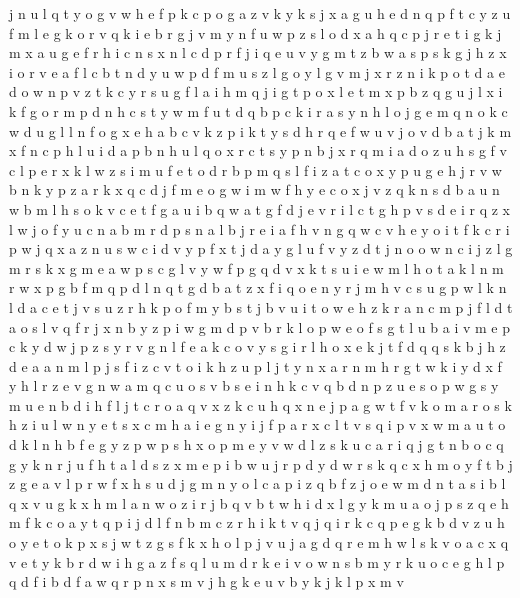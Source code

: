 \documentclass{article}
\begin{document}
j n u l q t y o g v w h e f p k c
p o g a z v k
y k s j x a g u h e d n q p f
t
c y z u f m l e g k o r v q
k i e b r g j v m y n f u w p z s l o d x a h q c
p j r e t i g
k j m x a u g e f r h i c n s
x n l c d p r f j i q e u v y g m t z b w a s
p s k g j h z x i o r v e a f l c b t n d y u w
p d f m u s z l g o
y l g v m j x r z n i k p o t d a e
d o w n p v z t k c y r s u g f l a i h m q j
i g t p o x l e
t m x p b z q g
u j l x i k f g o r m p d n h c s t y
w m f u t d q b p c k i r a s y n h l o j g e
m q n o k c w d u g l
l n f o g x e h a b c v k z p
i k t y s d h r q e f w u v j
o v d b a t j k m x f n c p h l u
i d a p b n h u l q o x r c t s y
p n b j x r q m i a d o z u h s g f v c
l p e r x k
l w z s i m u f e t o d r b p
m q s l f i z a t c o x y p u g e h j r v w b n k
y p
z a r k x q c d j f m e o g w i
m w f h y e c o x j v z q k n s d b a u
n w b m l h s o k v c e t f g a u i
b q w a t g f d j e v r i l c
t g h p v s d e i r q z x l w j o f y u c n a b m
r d p s n a
l b j r e i a f h v n
g q w c v h e y o i t f k
c
r i p w j q x
a z n u s w c i d v y p f x t j
d a y
g l u f v y z d t j n
o
o w n c i j z l g m r s
k x g m e a w p
s c g l v y
w
f p g q d v x k t s u i e w m l h o
t a k l n m r w x p g b f
m q p d l n
q t g
d b a t z x f i q o e n y r j m h v c s u g p w l k
n l d a c e t j v s u z r h k p o f m y b
s t j
b v u i t o w e h z k r a n c m p j f l d
t a o s l v q f r j x n b y z p i w g m
d p v b r k l o
p w e
o f s g t l u b a i v m e p c k y
d w j p z s y r v g n l f e a k c o
v y s g i r l h o x e k j t f d q
q s k b j h z d e a
a n m l p j s f i z c v t o
i k h z u p l j t y n x a r
n m h r g t w k i y d
x f y h l r z e v g n w a m q c u o s
v b s e i n h k c
v
q b d n p z u e s o
p w g s y m u e n b d i h f l j t c r o a q v x z k
c u h q x n e j p a g w t f v k o
m a r o s k h z i u l w n y e t
s x c m h a i
e g n y i j f p a r x c l t v
s q i p v x w m a u t o d k l n h b f e g y z
p w
p s h
x o p m e y v w d l z s k u c a r i q j g t n b
o c q g y k n r j u f h t a l d s z x m e p i b w
u j r p d y
d w r s k q c x h m o y f t b j z g e a v l p
r w f x h s u d j g m n y o l c a p i z q b
f z j o e w m d n t a s i b l q x v
u g k x h m l a n w o z i r j b q
v b t w h i d x l g y k m u a o j p s z q e
h m f k c o a y t q p i j d l
f n b m c z r h i k t v q j
q i r k c
q p e g k b d v z
u h o y e t
o k p x s j w t z g
s f k
x h o l p j v u
j a g d q r e m h w l s k v o
a c x q v e t y k b r d w
i h g a
z f s q l u m d r k e i v o
w n s b m y r k u o c e g h l p q d f i
b d f a w q r p n x s m v j h g k e u
v b y k
j k l p x m v
\end{document}
